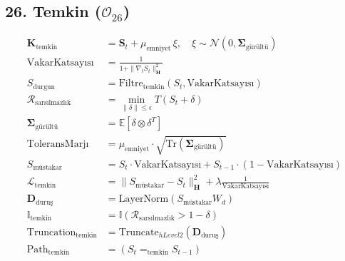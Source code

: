 \documentclass[11pt, a4paper]{article}
\begin{document}
\subsection{26. Temkin ($\mathcal{O}_{26}$)}
\begin{align}
\mathbf{K}_{\text{temkin}} &= \mathbf{S}_t + \mu_{\text{emniyet}} \, \xi, \quad \xi \sim \mathcal{N}(0, \mathbf{\Sigma}_{\text{gürültü}}) \\
\text{VakarKatsayısı} &= \frac{1}{1 + \|\nabla_t S_t\|_{\mathbf{H}}^2} \\
S_{\text{durgun}} &= \text{Filtre}_{\text{temkin}}(S_t, \text{VakarKatsayısı}) \\
\mathcal{R}_{\text{sarsılmazlık}} &= \min_{\|\delta\| \le \epsilon} T(S_t + \delta) \\
\mathbf{\Sigma}_{\text{gürültü}} &= \mathbb{E}[\delta \otimes \delta^T] \\
\text{ToleransMarjı} &= \mu_{\text{emniyet}} \cdot \sqrt{\text{Tr}(\mathbf{\Sigma}_{\text{gürültü}})} \\
S_{\text{müstakar}} &= S_t \cdot \text{VakarKatsayısı} + S_{t-1} \cdot (1 - \text{VakarKatsayısı}) \\
\mathcal{L}_{\text{temkin}} &= \| S_{\text{müstakar}} - S_t \|_{\mathbf{H}}^2 + \lambda \frac{1}{\text{VakarKatsayısı}} \\
\mathbf{D}_{\text{duruş}} &= \text{LayerNorm}(S_{\text{müstakar}} W_d) \\
\mathbb{I}_{\text{temkin}} &= \mathbb{I}(\mathcal{R}_{\text{sarsılmazlık}} > 1 - \delta) \\
\text{Truncation}_{\text{temkin}} &= \text{Truncate}_{hLevel 2}(\mathbf{D}_{\text{duruş}}) \\
\text{Path}_{\text{temkin}} &= (S_t =_{\text{temkin}} S_{t-1})
\end{align}
\end{document}
